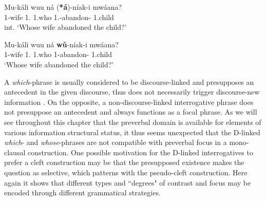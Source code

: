 \documentclass[output=paper,colorlinks,citecolor=brown,
]{langscibook}
\begin{document}
\begin{exe}
    \ex \label{39}
    \begin{xlist}
\ex
\label{39a}
\gll
Mu-káli wuu n\'{a} (\textbf{*á})-n\'{i}ak-i mw\'{a}ana?\\
1-wife 1.\Conn{} 1.who {\db}1\Sm{}.\Pst{}-abandon-\Pst{} 1.child\\
\trans int. ‘Whose wife abandoned the child?’

\ex
\label{39b}
\gll
Mu-káli wuu n\'{a} \textbf{wǔ}-n\'{i}ak-i mw\'{a}ana?\\
1-wife 1.\Conn{} 1.who 1\Rel{}-abandon-\Pst{} 1.child\\
\trans ‘Whose wife abandoned the child?’

    \end{xlist}
\end{exe}
A \textit{which}-phrase is usually considered to be discourse-linked and presupposes an antecedent in the given discourse, thus does not necessarily trigger discourse-new information \citep{Şener2010}. On the opposite, a non-discourse-linked interrogative phrase does not presuppose an antecedent and always functions as a focal phrase. As we will see throughout this chapter that the preverbal domain is available for elements of various information structural status, it thus seems unexpected that the D-linked \textit{which}- and \textit{whose}-phrases are not compatible with preverbal focus in a mono-clausal construction. One possible motivation for the D-linked interrogatives to prefer a cleft construction may be that the presupposed existence makes the question as selective, which patterns with the pseudo-cleft construction. Here again it shows that different types and ``degrees" of contrast and focus may be encoded through different grammatical strategies.
\end{document}

